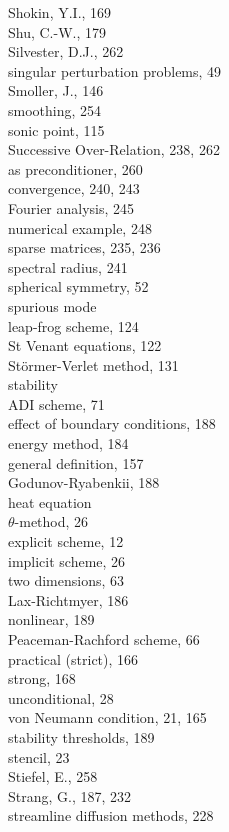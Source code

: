 \documentclass[10pt]{article}
\begin{document}
Shokin, Y.I., 169\\
Shu, C.-W., 179\\
Silvester, D.J., 262\\
singular perturbation problems, 49\\
Smoller, J., 146\\
smoothing, 254\\
sonic point, 115\\
Successive Over-Relation, 238, 262\\
as preconditioner, 260\\
convergence, 240, 243\\
Fourier analysis, 245\\
numerical example, 248\\
sparse matrices, 235, 236\\
spectral radius, 241\\
spherical symmetry, 52\\
spurious mode\\
leap-frog scheme, 124\\
St Venant equations, 122\\
Störmer-Verlet method, 131\\
stability\\
ADI scheme, 71\\
effect of boundary conditions, 188\\
energy method, 184\\
general definition, 157\\
Godunov-Ryabenkii, 188\\
heat equation\\
\(\theta\)-method, 26\\
explicit scheme, 12\\
implicit scheme, 26\\
two dimensions, 63\\
Lax-Richtmyer, 186\\
nonlinear, 189\\
Peaceman-Rachford scheme, 66\\
practical (strict), 166\\
strong, 168\\
unconditional, 28\\
von Neumann condition, 21, 165\\
stability thresholds, 189\\
stencil, 23\\
Stiefel, E., 258\\
Strang, G., 187, 232\\
streamline diffusion methods, 228\\
\end{document}
